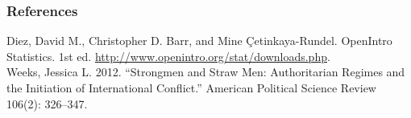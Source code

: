 \documentclass{beamer}\usepackage{graphicx, color}
\begin{document}
\begin{frame}[allowframebreaks]
  \frametitle{References}
  Diez, David M., Christopher D. Barr, and Mine \c{C}etinkaya-Rundel. OpenIntro Statistics. 1st ed. \url{http://www.openintro.org/stat/downloads.php}. \\[0.25cm] 
  
  Weeks, Jessica L. 2012. “Strongmen and Straw Men: Authoritarian Regimes and the Initiation of International Conflict.” American Political Science Review 106(2): 326–347.
\end{frame}
\end{document}
